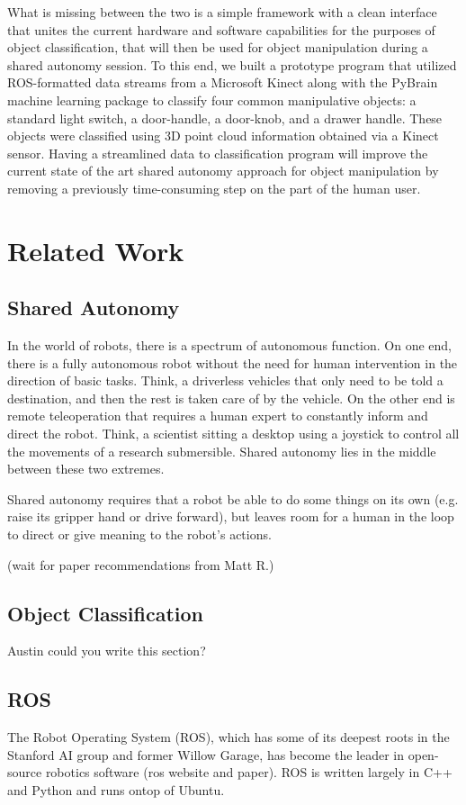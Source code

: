 \documentclass{article}
\begin{document}
What is missing between the two is a simple framework with a clean interface that unites the current hardware and software capabilities for the purposes of object classification, that will then be used for object manipulation during a shared autonomy session. To this end, we built a prototype program that utilized ROS-formatted data streams from a Microsoft Kinect along with the PyBrain machine learning package to classify four common manipulative objects: a standard light switch, a door-handle, a door-knob, and a drawer handle. These objects were classified using 3D point cloud information obtained via a Kinect sensor. Having a streamlined data to classification program will improve the current state of the art shared autonomy approach for object manipulation by removing a previously time-consuming step on the part of the human user.

\section{Related Work}
\subsection{Shared Autonomy}
In the world of robots, there is a spectrum of autonomous function.  On one end, there is a fully autonomous robot
without the need for human intervention in the direction of basic tasks.  Think, a driverless vehicles that only need to be told a destination, and then the rest is taken care of by the vehicle.  On the other end is remote teleoperation that requires a human expert to constantly inform and direct the robot.  Think, a scientist sitting a desktop using a joystick to control all the movements of a research submersible. Shared autonomy lies in the middle between these two extremes. 

Shared autonomy requires that a robot be able to do some things on its own (e.g. raise its gripper hand or drive forward), but leaves
room for a human in the loop to direct or give meaning to the robot's actions.

(wait for paper recommendations from Matt R.)

\subsection{Object Classification}
Austin could you write this section?

\subsection{ROS}
The Robot Operating System (ROS), which has some of its deepest roots in the Stanford AI group and former Willow Garage, 
has become the leader in open-source robotics software (ros website and paper). ROS is written largely in C++ and Python and runs ontop of Ubuntu.  
\end{document}
